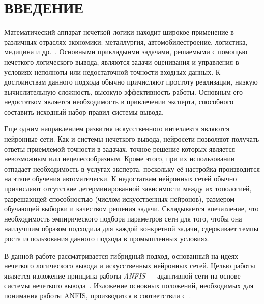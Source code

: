 \section*{ВВЕДЕНИЕ}

Математический аппарат нечеткой логики находит широкое применение
в различных отраслях экономики: металлургия, автомобилестроение,
логистика, медицина и др.~\cite{terano92}.
Основными прикладынми задачами, решаемыми с помощью нечеткого логического вывода,
являются задачи оценивания и управления в условиях неполноты или
недостаточной точности входных данных.
К достоинствам данного подхода обычно причисляют простоту реализации,
низкую вычислительную сложность, высокую эффективность работы.
Основным его недостатком является необходимость в
привлечении эксперта, способного составить исходный набор правил системы вывода.

Еще одним направлением развития искусственного интеллекта являются нейронные сети.
Как и системы нечеткого вывода, нейросети позволяют получать ответы приемлемой точности
в задачах, точное решение которых является невозможным или нецелесообразным.
Кроме этого, при их использовании отпадает необходимость в услугах эксперта,
поскольку её настройка производится на этапе обучения автоматически.
К недостаткам нейронных сетей обычно причисляют отсутствие
детерминированной зависимости между их топологией,
разрешающей способностью (числом искусственных нейронов),
размером обучающей выборки и качеством решения задачи.
Складывается впечатление, что необходимость эмпирического подбора параметров сети
для того, чтобы она наилучшим образом подходила для каждой конкретной задачи,
сдерживает темпы роста использования данного подхода в промышленных условиях.

В данной работе рассматривается гибридный подход,
основанный на идеях нечеткого логического вывода и
искусственных нейронных сетей.
Целью работы является изложение принципа работы \emph{ANFIS} ---
адаптивной сети на основе системы нечеткого
вывода~\cite{Jang93anfis:adaptive-network-based}.
Изложение основных положений, необходимых для понимания работы ANFIS,
производится в соответствии с~\cite{kruglov2001}.
